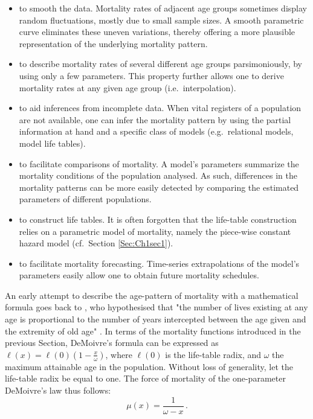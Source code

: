 \documentclass[Thesis]{subfiles}
\begin{document}
\medskip
\begin{itemize}
	\item to smooth the data. Mortality rates of adjacent age groups sometimes display random fluctuations, mostly due to small sample sizes. A smooth parametric curve eliminates these uneven variations, thereby offering a more plausible representation of the underlying mortality pattern. 
	\item to describe mortality rates of several different age groups parsimoniously, by using only a few parameters. This property further allows one to derive mortality rates at any given age group (i.e.~interpolation). 
	\item to aid inferences from incomplete data. When vital registers of a population are not available, one can infer the mortality pattern by using the partial information at hand and a specific class of models (e.g.~relational models, model life tables).
	\item to facilitate comparisons of mortality. A model's parameters summarize the mortality conditions of the population analysed. As such, differences in the mortality patterns can be more easily detected by comparing the estimated parameters of different populations.
	\item to construct life tables. It is often forgotten that the life-table construction relies on a parametric model of mortality, namely the piece-wise constant hazard model (cf.~Section \ref{Sec:Ch1sec1}). 
	\item to facilitate mortality forecasting. Time-series extrapolations of the model's parameters easily allow one to obtain future mortality schedules.	
\end{itemize}
\smallskip

An early attempt to describe the age-pattern of mortality with a mathematical formula goes back to \cite{demoivre1725annuities}, who hypothesised that "the number of lives existing at any age is proportional to the number of years intercepted between the age given and the extremity of old age" \cite[][cited in \cite{smith1977mathematical}, p.~273]{demoivre1725annuities}. In terms of the mortality functions introduced in the previous Section, DeMoivre's formula can be expressed as $\ell(x)=\ell(0) \left(1-\frac{x}{\omega}\right)$,
where $\ell(0)$ is the life-table radix, and $\omega$ the maximum attainable age in the population. Without loss of generality, let the life-table radix be equal to one. The force of mortality of the one-parameter DeMoivre's law thus follows:
%
\begin{equation}
\mu(x)=\frac{1}{\omega-x} \,.
\end{equation}
%
\end{document}
